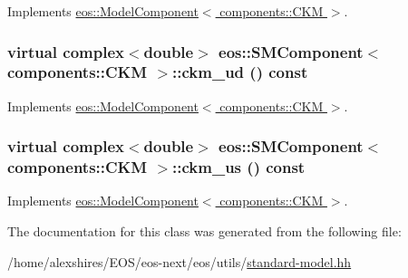 Implements \hyperlink{classeos_1_1ModelComponent_3_01components_1_1CKM_01_4_a71547bad7b092be1631067f270056acd}{eos::ModelComponent$<$ components::CKM $>$}.\hypertarget{classeos_1_1SMComponent_3_01components_1_1CKM_01_4_a850dc3770b53e2cf3e8cfeb466ee311e}{
\subsubsection[{ckm\_\-ud}]{\setlength{\rightskip}{0pt plus 5cm}virtual complex$<$double$>$ eos::SMComponent$<$ components::CKM $>$::ckm\_\-ud () const}}
\label{classeos_1_1SMComponent_3_01components_1_1CKM_01_4_a850dc3770b53e2cf3e8cfeb466ee311e}


Implements \hyperlink{classeos_1_1ModelComponent_3_01components_1_1CKM_01_4_a56044f519ef2befa09d4912cb8f9188a}{eos::ModelComponent$<$ components::CKM $>$}.\hypertarget{classeos_1_1SMComponent_3_01components_1_1CKM_01_4_a4dcb7f6ada6e03fd3810c4c98c9cffa8}{
\subsubsection[{ckm\_\-us}]{\setlength{\rightskip}{0pt plus 5cm}virtual complex$<$double$>$ eos::SMComponent$<$ components::CKM $>$::ckm\_\-us () const}}
\label{classeos_1_1SMComponent_3_01components_1_1CKM_01_4_a4dcb7f6ada6e03fd3810c4c98c9cffa8}


Implements \hyperlink{classeos_1_1ModelComponent_3_01components_1_1CKM_01_4_ac3363cbfe22a4354e833a67fdc5ed1fa}{eos::ModelComponent$<$ components::CKM $>$}.

The documentation for this class was generated from the following file:\begin{DoxyCompactItemize}
\item 
/home/alexshires/EOS/eos-\/next/eos/utils/\hyperlink{standard-model_8hh}{standard-\/model.hh}\end{DoxyCompactItemize}
